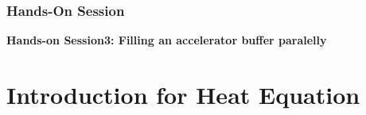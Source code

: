 \documentclass[9pt]{beamer}
\begin{document}




\begin{frame}
\frametitle{Hands-On Session}
\begin{center}
      \Huge \textbf{Hands-on Session3: Filling an accelerator buffer paralelly}
  \end{center}
\end{frame}

\section{Introduction for Heat Equation} %
\end{document}
